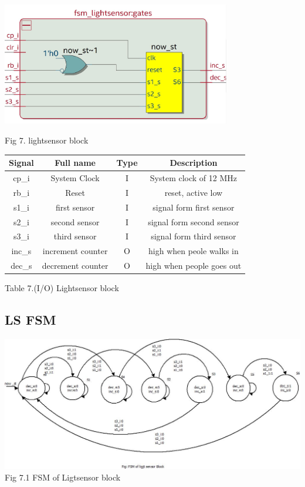 \documentclass{article}
\begin{document}
\begin{center}

\includegraphics[width=10cm]{ls.JPG}
\end{center}
    Fig 7. lightsensor block
    \vspace{2cm}
 \begin{center}
           \begin{tabular}{|c|c|c|c|}
         \hline
        Signal   & Full name  & Type & Description\\
        \hline
        \hline
        cp\_i  & System Clock  & I & System clock of 12 MHz \\ 
        \hline
        rb\_i  & Reset   & I & reset, active low \\
        \hline 
        s1\_i &   first sensor  & I & signal form first sensor \\
        \hline
        s2\_i &   second sensor & I & signal form second sensor\\
        \hline
        s3\_i &   third sensor & I & signal form third sensor \\
        \hline
        inc\_s &  increment counter & O & high when peole walks in \\
        \hline
        dec\_s &  decrement counter  & O & high when people goes out \\
        \hline
          \end{tabular}
          \vspace{0.5cm}
          
          Table 7.(I/O) Lightsensor block
       \end{center}
       \newpage
       \subsection{LS FSM}
       \begin{center}
\includegraphics[width=15cm]{lightsensorfsm.jpeg}
Fig 7.1 FSM of Ligtsensor block
\end{center}
\end{document}
